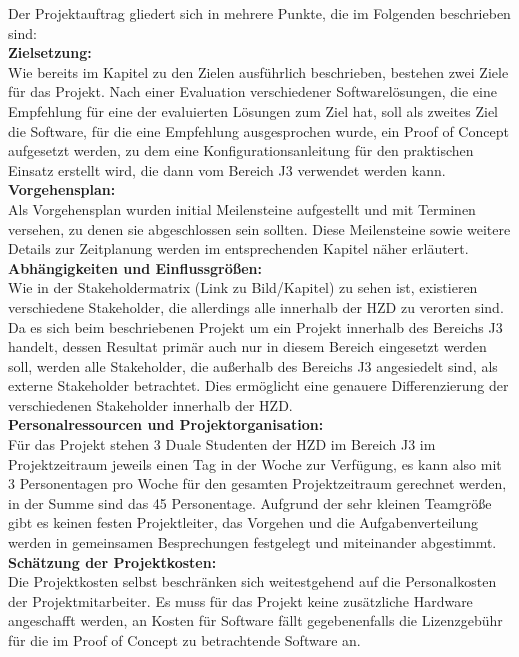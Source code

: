 \documentclass[ThesisDJ.tex]{subfiles}
\begin{document}
	Der Projektauftrag gliedert sich in mehrere Punkte, die im Folgenden beschrieben sind:\bigskip\\
	\textbf{Zielsetzung:}\medskip\\
	Wie bereits im Kapitel zu den Zielen ausführlich beschrieben, bestehen zwei Ziele für das Projekt. Nach einer Evaluation verschiedener Softwarelösungen, die eine Empfehlung für eine der evaluierten Lösungen zum Ziel hat, soll als zweites Ziel die Software, für die eine Empfehlung ausgesprochen wurde, ein Proof of Concept aufgesetzt werden, zu dem eine Konfigurationsanleitung für den praktischen Einsatz erstellt wird, die dann vom Bereich J3 verwendet werden kann.\bigskip\\
	\textbf{Vorgehensplan:}\medskip\\
	Als Vorgehensplan wurden initial Meilensteine aufgestellt und mit Terminen versehen, zu denen sie abgeschlossen sein sollten. Diese Meilensteine sowie weitere Details zur Zeitplanung werden im entsprechenden Kapitel näher erläutert.\bigskip\\
	\textbf{Abhängigkeiten und Einflussgrößen:}	\medskip\\
	Wie in der Stakeholdermatrix (Link zu Bild/Kapitel) zu sehen ist, existieren verschiedene Stakeholder, die allerdings alle innerhalb der HZD zu verorten sind. Da es sich beim beschriebenen Projekt um ein Projekt innerhalb des Bereichs J3 handelt, dessen Resultat primär auch nur in diesem Bereich eingesetzt werden soll, werden alle Stakeholder, die außerhalb des Bereichs J3 angesiedelt sind, als externe Stakeholder betrachtet. Dies ermöglicht eine genauere Differenzierung der verschiedenen Stakeholder innerhalb der HZD.\bigskip\\
	\textbf{Personalressourcen und Projektorganisation:}\medskip\\
	Für das Projekt stehen 3 Duale Studenten der HZD im Bereich J3 im Projektzeitraum jeweils einen Tag in der Woche zur Verfügung, es kann also mit 3 Personentagen pro Woche für den gesamten Projektzeitraum gerechnet werden, in der Summe sind das 45 Personentage.
	Aufgrund der sehr kleinen Teamgröße gibt es keinen festen Projektleiter, das Vorgehen und die Aufgabenverteilung werden in gemeinsamen Besprechungen festgelegt und miteinander abgestimmt.\bigskip\\
	\textbf{Schätzung der Projektkosten:}\medskip\\
	Die Projektkosten selbst beschränken sich weitestgehend auf die Personalkosten der Projektmitarbeiter.
	Es muss für das Projekt keine zusätzliche Hardware angeschafft werden, an Kosten für Software fällt gegebenenfalls die Lizenzgebühr für die im Proof of Concept zu betrachtende Software an.\bigskip\\
\end{document}
